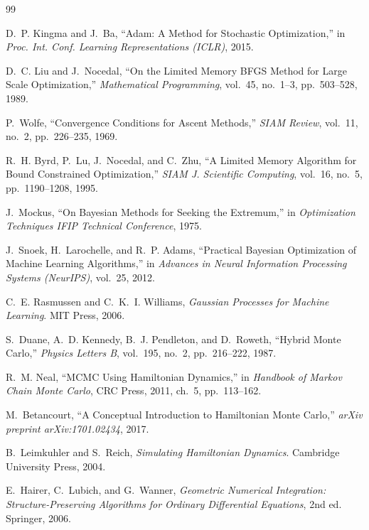 \documentclass[12pt,a4paper]{article}
\begin{document}


\begin{thebibliography}{99}

D.~P. Kingma and J.~Ba,
``Adam: A Method for Stochastic Optimization,''
in \textit{Proc. Int. Conf. Learning Representations (ICLR)}, 2015.

D.~C. Liu and J.~Nocedal,
``On the Limited Memory BFGS Method for Large Scale Optimization,''
\textit{Mathematical Programming}, vol.~45, no.~1--3, pp.~503--528, 1989.

P.~Wolfe,
``Convergence Conditions for Ascent Methods,''
\textit{SIAM Review}, vol.~11, no.~2, pp.~226--235, 1969.

R.~H. Byrd, P.~Lu, J.~Nocedal, and C.~Zhu,
``A Limited Memory Algorithm for Bound Constrained Optimization,''
\textit{SIAM J. Scientific Computing}, vol.~16, no.~5,
pp.~1190--1208, 1995.

J.~Mockus,
``On Bayesian Methods for Seeking the Extremum,''
in \textit{Optimization Techniques IFIP Technical Conference}, 1975.

J.~Snoek, H.~Larochelle, and R.~P. Adams,
``Practical Bayesian Optimization of Machine Learning Algorithms,''
in \textit{Advances in Neural Information Processing Systems (NeurIPS)},
vol.~25, 2012.

C.~E. Rasmussen and C.~K.~I. Williams,
\textit{Gaussian Processes for Machine Learning}.
MIT Press, 2006.

S.~Duane, A.~D. Kennedy, B.~J. Pendleton, and D.~Roweth,
``Hybrid Monte Carlo,''
\textit{Physics Letters B}, vol.~195, no.~2, pp.~216--222, 1987.

R.~M. Neal,
``MCMC Using Hamiltonian Dynamics,''
in \textit{Handbook of Markov Chain Monte Carlo}, CRC Press, 2011,
ch.~5, pp.~113--162.

M.~Betancourt,
``A Conceptual Introduction to Hamiltonian Monte Carlo,''
\textit{arXiv preprint arXiv:1701.02434}, 2017.

B.~Leimkuhler and S.~Reich,
\textit{Simulating Hamiltonian Dynamics}.
Cambridge University Press, 2004.

E.~Hairer, C.~Lubich, and G.~Wanner,
\textit{Geometric Numerical Integration: Structure-Preserving Algorithms
for Ordinary Differential Equations}, 2nd ed.
Springer, 2006.


\end{thebibliography}
\end{document}
